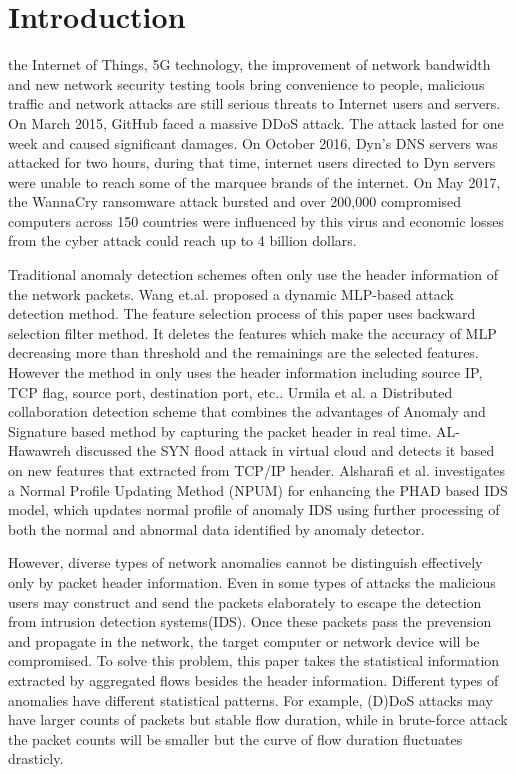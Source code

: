 \documentclass{ieeeaccess}
\theoremstyle{definition}
\begin{document}
\section{Introduction}
\label{sec:introduction}
 the Internet of Things, 5G technology, the improvement of network bandwidth and new network security testing tools bring convenience to people, malicious traffic and network attacks are still serious threats to Internet users and servers. 
On March 2015, GitHub faced a massive DDoS attack. The attack lasted for one week and caused significant damages\cite{github-2015}. On October 2016, Dyn's DNS servers was attacked for two hours, during that time, internet users directed to Dyn servers were unable to reach some of the marquee brands of the internet\cite{dyn-2016}. On May 2017, the WannaCry ransomware attack bursted and over 200,000 compromised computers across 150 countries were influenced by this virus and economic losses from the cyber attack could reach up to 4 billion dollars\cite{wannacry-2017}.

Traditional anomaly detection schemes often only use the header information of the network packets. Wang et.al. \cite{Wang2020CS} proposed a dynamic MLP-based attack detection method. The feature selection process of this paper uses backward selection filter method. It deletes the features which make the accuracy of MLP decreasing more than threshold and the remainings are the selected features. However the method in \cite{Wang2020CS} only uses the header information including source IP, TCP flag, source port, destination port, etc.. Urmila et al.\cite{Urmila2017} a Distributed collaboration detection scheme that combines the advantages of Anomaly and Signature based method by capturing the packet header in real time. AL-Hawawreh\cite{MunaSulieman2017} discussed the SYN flood attack in virtual cloud and detects it based on new features that extracted from TCP/IP header. Alsharafi et al.\cite{Alsharafi2020} investigates a Normal Profile Updating Method (NPUM) for enhancing the PHAD based IDS model, which updates normal profile of anomaly IDS using further processing of both the normal and abnormal data identified by anomaly detector.

However, diverse types of network anomalies cannot be distinguish effectively only by packet header information. Even in some types of attacks the malicious users may construct and send the packets elaborately to escape the detection from intrusion detection systems(IDS). Once these packets pass the prevension and propagate in the network, the target computer or network device will be compromised.
To solve this problem, this paper takes the statistical information extracted by aggregated flows besides the header information. Different types of anomalies have different statistical patterns. For example, (D)DoS attacks may have larger counts of packets but stable flow duration, while in brute-force attack the packet counts will be smaller but the curve of flow duration fluctuates drasticly. 
\end{document}

